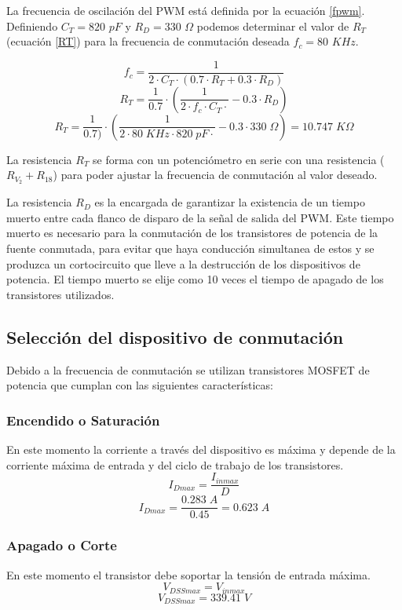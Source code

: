 \documentclass[11pt, a4paper]{article}
\begin{document}
La frecuencia de oscilación del PWM está definida por la ecuación \ref{fpwm}. Definiendo $C_T = 820$ $pF$ y $R_D = 330$ $\Omega$ podemos determinar el valor de $R_T$ (ecuación \ref{RT}) para la frecuencia de conmutación deseada $f_c = 80$ $KHz$.

\begin{equation}
f_c = \frac{1}{2 \cdot C_T \cdot (0.7 \cdot R_T + 0.3 \cdot R_D)}
\label{fpwm}
\end{equation}
\begin{equation}
R_T = \frac{1}{0.7} \cdot (\frac{1}{2 \cdot f_c \cdot C_T \cdot} - 0.3 \cdot R_D)
\label{RT}
\end{equation}
\[ R_T = \frac{1}{0.7)} \cdot (\frac{1}{2 \cdot 80 \; KHz \cdot 820 \; pF \cdot} - 0.3 \cdot 330 \; \Omega) = 10.747 \; K\Omega \]

La resistencia $R_T$ se forma con un potenciómetro en serie con una resistencia ($R_{V_{2}} + R_{18}$) para poder ajustar la frecuencia de conmutación al valor deseado.

La resistencia $R_D$ es la encargada de garantizar la existencia de un tiempo muerto entre cada flanco de disparo de la señal de salida del PWM. Este tiempo muerto es necesario para la conmutación de los transistores de potencia de la fuente conmutada, para evitar que haya conducción simultanea de estos y se produzca un cortocircuito que lleve a la destrucción de los dispositivos de potencia. El tiempo muerto se elije como 10 veces el tiempo de apagado de los transistores utilizados.

\subsection{Selección del dispositivo de conmutación}
Debido a la frecuencia de conmutación se utilizan transistores MOSFET de potencia que cumplan con las siguientes características:
\subsubsection{Encendido o Saturación}
En este momento la corriente a través del dispositivo es máxima y depende de la corriente máxima de entrada y del ciclo de trabajo de los transistores.
\begin{equation}
I_{Dmax} = \frac{I_{inmax}}{D}
\label{IDmax}
\end{equation}
\[ I_{Dmax} = \frac{0.283 \; A}{0.45} = 0.623 \; A \]

\subsubsection{Apagado o Corte}
En este momento el transistor debe soportar la tensión de entrada máxima.
\begin{equation}
V_{DSSmax} = V_{inmax}
\label{VDmax}
\end{equation}
\[ V_{DSSmax} = 339.41 \; V \]
\end{document}
